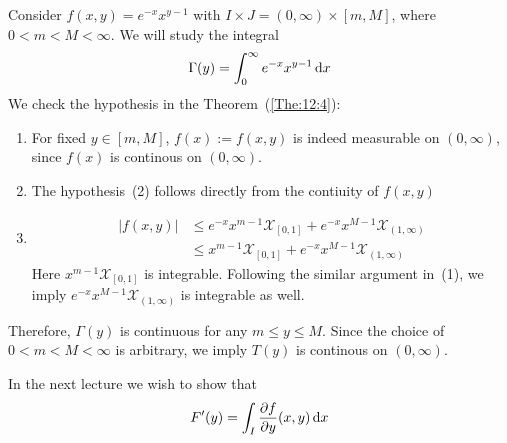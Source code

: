 \begin{example}
Consider $f(x,y) = e^{-x}x^{y-1}$ with $I\times J = (0,\infty)\times[m,M]$, where $0<m<M<\infty$.
We will study the integral
\[
\Gamma(y) = \int_0^\infty e^{-x}x^{y-1}\,\mathrm{d} x
\]
We check the hypothesis in the Theorem~(\ref{The:12:4}):
\begin{enumerate}
\item
For fixed $y\in[m,M]$, $f(x):=f(x,y)$ is indeed measurable on $(0,\infty)$, since $f(x)$ is continous on $(0,\infty)$.
\item
The hypothesis~(2) follows directly from the contiuity of $f(x,y)$
\item
\begin{align*}
|f(x,y)|&\le e^{-x}x^{m-1}\mathcal{X}_{[0,1]}+e^{-x}x^{M-1}\mathcal{X}_{(1,\infty)}\\
&\le x^{m-1}\mathcal{X}_{[0,1]}+e^{-x}x^{M-1}\mathcal{X}_{(1,\infty)}
\end{align*}
Here $x^{m-1}\mathcal{X}_{[0,1]}$ is integrable. 
Following the similar argument in~(1), we imply $e^{-x}x^{M-1}\mathcal{X}_{(1,\infty)}$ is integrable as well.
\end{enumerate}
Therefore, $\Gamma(y)$ is continuous for any $m\le y\le M$.
Since the choice of $0<m<M<\infty$ is arbitrary, we imply $T(y)$ is continous on $(0,\infty)$.

In the next lecture we wish to show that
\[
F'(y) = \int_I\frac{\partial f}{\partial y}(x,y)\,\mathrm{d} x
\]
\end{example}











